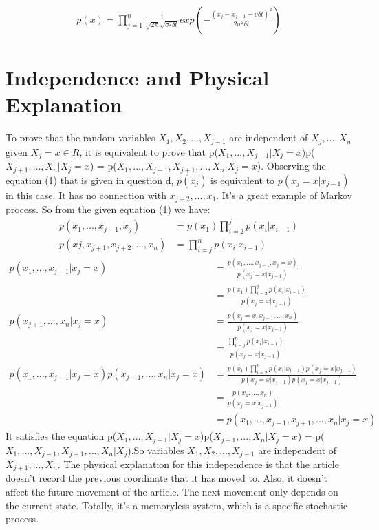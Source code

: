 \documentclass[twoside,11pt]{article}
\begin{document}
\begin{align}
    p(x) = \prod_{j=1}^{n}\frac{1}{\sqrt{2\pi}\sqrt{\sigma^{2}\delta t}}exp(-\frac{(x_{j}-x_{j-1}-\upsilon\delta t)^{2}}{2\sigma^{2}\delta t})
\end{align}

\section{Independence and Physical Explanation}

To prove that the random variables $X_{1}, X_{2}, ..., X_{j-1}$ are independent of $X_{j}, ..., X_{n}$ given $X_{j} = x \in R$, it is equivalent to prove that p($X_{1}, ..., X_{j-1}|X_{j} = x$)p($X_{j+1}, ..., X_{n}|X_{j} = x$) = p($X_{1},...,X_{j-1},X_{j+1},...,X_{n}|X_{j} = x$).
Observing the equation (1) that is given in question d, $p(x_{j})$ is equivalent to $p(x_{j} = x|x_{j-1})$ in this case. It has no connection with $x_{j-2},...,x_{1}$. It's a great example of Markov process. So from the given equation (1) we have:
\begin{align}
    p(x_{1},...,x_{j-1},x_{j}) &= p(x_{1})\prod_{i=2}^{j}p(x_{i}|x_{i-1})\\
    p(x{j},x_{j+1},x_{j+2},...,x_{n}) &= \prod_{i=j}^{n}p(x_{i}|x_{i-1})
\end{align}
\begin{equation}
    \begin{split}
        p(x_{1},...,x_{j-1}|x_{j} = x) &= \frac{p(x_{1},...,x_{j-1},x_{j} = x)}{p(x_{j} = x|x_{j-1})}\\
        &= \frac{p(x_{1})\prod_{i=2}^{j}p(x_{i}|x_{i-1})}{p(x_{j} = x|x_{j-1})}\\
        p(x_{j+1},...,x_{n}|x_{j } = x) &= \frac{p(x_{j} = x,x_{j+1},...,x_{n})}{p(x_{j} = x|x_{j-1})}\\
        &= \frac{\prod_{i=j}^{n}p(x_{i}|x_{i-1})}{p(x_{j} = x|x_{j-1})}\\
        p(x_{1},...,x_{j-1}|x_{j} = x)p(x_{j+1},...,x_{n}|x_{j} = x) &= \frac{p(x_{1})\prod_{i=2}^{n}p(x_{i}  |x_{i-1})p(x_{j} = x|x_{j-1})}{p(x_{j} = x|x_{j-1})p(x_{j} = x|x_{j-1})}\\
        &= \frac{p(x_{1},...,x_{n})}{p(x_{j} = x|x_{j-1})}\\
        &= p(x_{1},...,x_{j-1},x_{j+1},...,x_{n}|x_{j} = x)
    \end{split}
\end{equation}
It satisfies the equation p($X_{1}, ..., X_{j-1}|X_{j} = x$)p($X_{j+1}, ..., X_{n}|X_{j} = x$) = p($X_{1},...,X_{j-1},X_{j+1},...,X_{n}|X_{j}$).So variables $X_{1}, X_{2}, ..., X_{j-1}$ are independent of $X_{j+1}, ..., X_{n}$.
The physical explanation for this independence is that the article doesn't record the previous coordinate that it has moved to. Also, it doesn't affect the future movement of the article. The next movement only depends on the current state. Totally, it's a memoryless system, which is a specific stochastic process.
\end{document}
